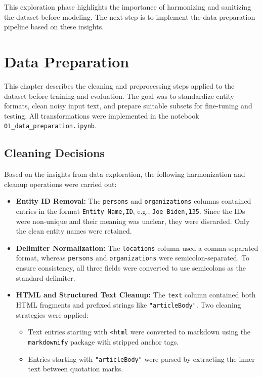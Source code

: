 This exploration phase highlights the importance of harmonizing and sanitizing the dataset before modeling. The next step is to implement the data preparation pipeline based on these insights.


\chapter{Data Preparation}
\label{ch:Data-Preparation}

This chapter describes the cleaning and preprocessing steps applied to the dataset before training and evaluation. The goal was to standardize entity formats, clean noisy input text, and prepare suitable subsets for fine-tuning and testing. All transformations were implemented in the notebook \texttt{01\_data\_preparation.ipynb}.

\section{Cleaning Decisions}

Based on the insights from data exploration, the following harmonization and cleanup operations were carried out:

\begin{itemize}
  \item \textbf{Entity ID Removal:} The \texttt{persons} and \texttt{organizations} columns contained entries in the format \texttt{Entity Name,ID}, e.g., \texttt{Joe Biden,135}. Since the IDs were non-unique and their meaning was unclear, they were discarded. Only the clean entity names were retained.
  
  \item \textbf{Delimiter Normalization:} The \texttt{locations} column used a comma-separated format, whereas \texttt{persons} and \texttt{organizations} were semicolon-separated. To ensure consistency, all three fields were converted to use semicolons as the standard delimiter.
  
  \item \textbf{HTML and Structured Text Cleanup:} The \texttt{text} column contained both HTML fragments and prefixed strings like \texttt{"articleBody"}. Two cleaning strategies were applied:
    \begin{itemize}
      \item Text entries starting with \texttt{<html} were converted to markdown using the \texttt{markdownify} package with stripped anchor tags.
      \item Entries starting with \texttt{"articleBody"} were parsed by extracting the inner text between quotation marks.
    \end{itemize}
\end{itemize}

